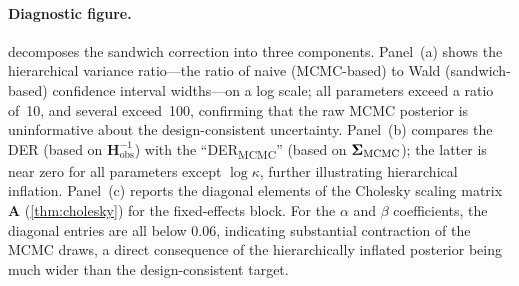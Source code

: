 \paragraph{Diagnostic figure.}
 decomposes the sandwich correction into three
components.  Panel~(a) shows the hierarchical variance ratio---the ratio of
naive (MCMC-based) to Wald (sandwich-based) confidence interval
widths---on a log scale; all parameters exceed a ratio of~10, and
several exceed~100, confirming that the raw MCMC posterior is
uninformative about the design-consistent uncertainty.  Panel~(b)
compares the DER (based on $\mathbf{H}_{\mathrm{obs}}^{-1}$) with the
``DER\textsubscript{MCMC}'' (based on $\boldsymbol{\Sigma}_{\mathrm{MCMC}}$); the
latter is near zero for all parameters except $\log\kappa$, further
illustrating hierarchical inflation.  Panel~(c) reports the diagonal elements
of the Cholesky scaling matrix $\mathbf{A}$ (\cref{thm:cholesky})
for the fixed-effects block.
For the $\alpha$ and $\beta$ coefficients, the diagonal entries are
all below $0.06$, indicating substantial contraction of the MCMC draws, a direct consequence of the
hierarchically inflated posterior being much wider than the design-consistent
target.

